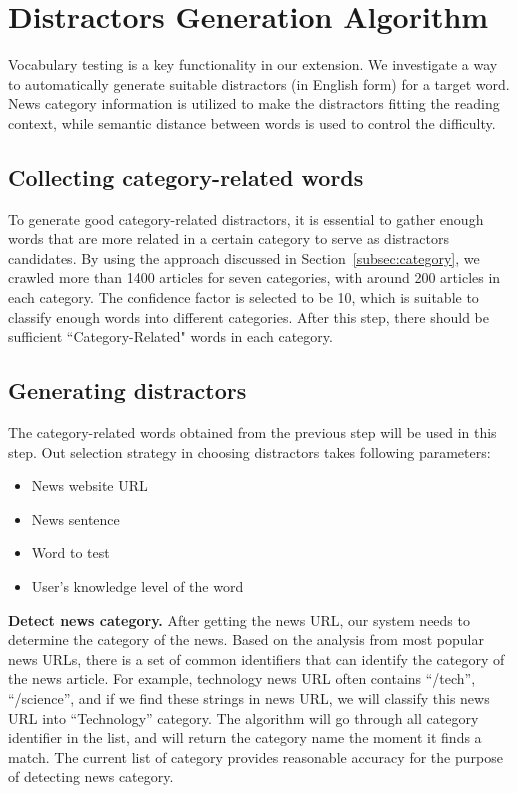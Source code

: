 \section{Distractors Generation Algorithm}
\label{sec:distractor}
Vocabulary testing is a key functionality in our extension. We investigate a way to
automatically generate suitable distractors (in English form) for a target word. News category information is utilized to make the distractors fitting the reading context, while semantic distance between words is used to control the difficulty.

\subsection{Collecting category-related words}
To generate good category-related distractors, it is essential to gather enough words that are more related in a certain category to serve as distractors candidates. By using the approach discussed in Section~\ref{subsec:category}, we crawled more than 1400 articles for seven categories, with around 200 articles in each category. The confidence factor is selected to be 10, which is suitable to classify enough words into different categories. After this step, there should be sufficient “Category-Related" words in each category.

\subsection{Generating distractors}
The category-related words obtained from the previous step will be used in this step. Out selection strategy in choosing distractors takes following parameters:
\begin{itemize}
\item News website URL
\item News sentence
\item Word to test
\item User’s knowledge level of the word
\end{itemize}
{\bf Detect news category.}
After getting the news URL, our system needs to determine the category of the news. Based on the analysis from most popular news URLs, there is a set of common identifiers that can identify the category of the news article. For example, technology news URL often contains “/tech”, “/science”, and if we find these strings in news URL, we will classify this news URL into “Technology” category. The algorithm will go through all category identifier in the list, and will return the category name the moment it finds a match. The current list of category provides reasonable accuracy for the purpose of detecting news category.

